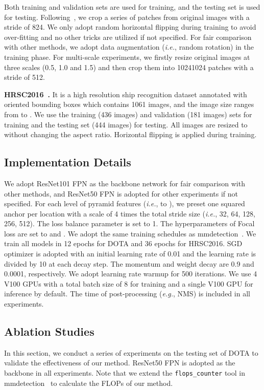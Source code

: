\documentclass[10pt,journal,final]{IEEEtran}
\def\eg{{\em e.g.}}
\def\ie{{\em i.e.}}
\begin{document}
Both training and validation sets are used for training, and the testing set is used for testing. Following~\cite{xia2018dota}, we crop a series of  patches from original images with a stride of 824. We only adopt random horizontal flipping during training to avoid over-fitting and no other tricks are utilized if not specified. For fair comparison with other methods, we adopt data augmentation (\ie, random rotation) in the training phase. For multi-scale experiments, we firstly resize original images at three scales (0.5, 1.0 and 1.5) and then crop them into 10241024 patches with a stride of 512.

{\bf HRSC2016~\cite{liu2017hrsc2016}.} It is a high resolution ship recognition dataset annotated with oriented bounding boxes which contains 1061 images, and the image size ranges from  to . We use the training (436 images) and validation (181 images) sets for training and the testing set (444 images) for testing. All images are resized to  without changing the aspect ratio. Horizontal flipping is applied during training.

\subsection{Implementation Details}
\label{sec:impl_detail}
We adopt ResNet101 FPN as the backbone network for fair comparison with other methods, and ResNet50 FPN is adopted for other experiments if not specified. For each level of pyramid features (\ie,  to ), we preset one squared anchor per location with a scale of 4 times the total stride size (\ie, 32, 64, 128, 256, 512). The loss balance parameter  is set to 1. The hyperparameters of Focal loss  are set to  and . We adopt the same training schedules as mmdetection~\cite{chen2019mmdetection}. We train all models in 12 epochs for DOTA and 36 epochs for HRSC2016. SGD optimizer is adopted with an initial learning rate of 0.01 and the learning rate is divided by 10 at each decay step. The momentum and weight decay are 0.9 and 0.0001, respectively. We adopt learning rate warmup for 500 iterations. We use 4 V100 GPUs with a total batch size of 8 for training and a single V100 GPU for inference by default. The time of post-processing (\eg, NMS) is included in all experiments.

\subsection{Ablation Studies}
In this section, we conduct a series of experiments on the testing set of DOTA to validate the effectiveness of our method. ResNet50 FPN is adopted as the backbone in all experiments. Note that we extend the \texttt{flops\_counter} tool in mmdetection~\cite{chen2019mmdetection} to calculate the FLOPs of our method.
\end{document}

